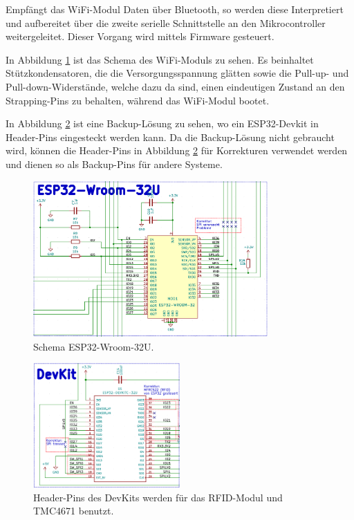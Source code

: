 Empfängt das WiFi-Modul Daten über Bluetooth, so werden diese Interpretiert und aufbereitet über die zweite serielle Schnittstelle an den Mikrocontroller weitergeleitet. Dieser Vorgang wird mittels Firmware gesteuert. 

In Abbildung \ref{fig:Schema_ESP32} ist das Schema des WiFi-Moduls zu sehen. Es beinhaltet Stützkondensatoren, die die Versorgungsspannung glätten sowie die Pull-up- und Pull-down-Widerstände, welche dazu da sind, einen eindeutigen Zustand an den Strapping-Pins zu behalten, während das WiFi-Modul bootet.

In Abbildung \ref{fig:Schema_ESP32_Devkit} ist eine Backup-Lösung zu sehen, wo ein ESP32-Devkit in Header-Pins eingesteckt werden kann. Da die Backup-Lösung nicht gebraucht wird, können die Header-Pins in Abbildung \ref{fig:Schema_ESP32_Devkit} für Korrekturen verwendet werden und dienen so als Backup-Pins für andere Systeme.

\begin{figure}[H]
	\centering
	\includegraphics[width=0.8\textwidth]{graphics/Schema_ESP32}
	\caption{Schema ESP32-Wroom-32U.}
	\label{fig:Schema_ESP32}
\end{figure}

\begin{figure}[H]
	\centering
	\includegraphics[width=0.5\textwidth]{graphics/Schema_ESP32_Devkit}
	\caption{Header-Pins des DevKits werden für das RFID-Modul und TMC4671 benutzt.}
	\label{fig:Schema_ESP32_Devkit}
\end{figure}

